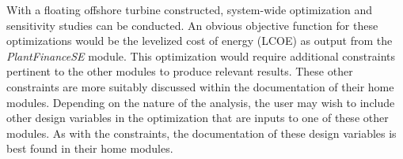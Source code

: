 With a floating offshore turbine constructed, system-wide optimization
and sensitivity studies can be conducted.  An obvious objective function
for these optimizations would be the levelized cost of energy (LCOE) as
output from the \textit{PlantFinanceSE} module.  This optimization would
require additional constraints pertinent to the other modules to produce
relevant results.  These other constraints are more suitably discussed
within the documentation of their home modules.  Depending on the nature
of the analysis, the user may wish to include other design variables in
the optimization that are inputs to one of these other modules.  As with
the constraints, the documentation of these design variables is best
found in their home modules.



